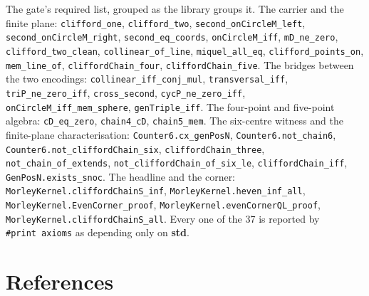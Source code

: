 \documentclass[11pt]{article}
\theoremstyle{definition}
\theoremstyle{remark}
\begin{document}
The gate's required list, grouped as the library groups it. The carrier and the finite plane:
\texttt{clifford\_\allowbreak one}, \texttt{clifford\_\allowbreak two}, \texttt{second\_\allowbreak onCircleM\_\allowbreak left}, \texttt{second\_\allowbreak onCircleM\_\allowbreak right}, \texttt{second\_\allowbreak eq\_\allowbreak coords},
\texttt{onCircleM\_\allowbreak iff}, \texttt{mD\_\allowbreak ne\_\allowbreak zero}, \texttt{clifford\_\allowbreak two\_\allowbreak clean}, \texttt{collinear\_\allowbreak of\_\allowbreak line}, \texttt{miquel\_\allowbreak all\_\allowbreak eq},
\texttt{clifford\_\allowbreak points\_\allowbreak on}, \texttt{mem\_\allowbreak line\_\allowbreak of}, \texttt{cliffordChain\_\allowbreak four}, \texttt{cliffordChain\_\allowbreak five}. The bridges between the
two encodings: \texttt{collinear\_\allowbreak iff\_\allowbreak conj\_\allowbreak mul}, \texttt{transversal\_\allowbreak iff}, \texttt{triP\_\allowbreak ne\_\allowbreak zero\_\allowbreak iff}, \texttt{cross\_\allowbreak second},
\texttt{cycP\_\allowbreak ne\_\allowbreak zero\_\allowbreak iff}, \texttt{onCircleM\_\allowbreak iff\_\allowbreak mem\_\allowbreak sphere}, \texttt{genTriple\_\allowbreak iff}. The four-point and five-point algebra:
\texttt{cD\_\allowbreak eq\_\allowbreak zero}, \texttt{chain4\_\allowbreak cD}, \texttt{chain5\_\allowbreak mem}. The six-centre witness and the finite-plane characterisation:
\texttt{Counter6.\allowbreak cx\_\allowbreak genPosN}, \texttt{Counter6.\allowbreak not\_\allowbreak chain6}, \texttt{Counter6.\allowbreak not\_\allowbreak cliffordChain\_\allowbreak six}, \texttt{cliffordChain\_\allowbreak three},
\texttt{not\_\allowbreak chain\_\allowbreak of\_\allowbreak extends}, \texttt{not\_\allowbreak cliffordChain\_\allowbreak of\_\allowbreak six\_\allowbreak le}, \texttt{cliffordChain\_\allowbreak iff}, \texttt{GenPosN.\allowbreak exists\_\allowbreak snoc}. The
headline and the corner: \texttt{MorleyKernel.\allowbreak cliffordChainS\_\allowbreak inf}, \texttt{MorleyKernel.\allowbreak heven\_\allowbreak inf\_\allowbreak all},
\texttt{MorleyKernel.\allowbreak EvenCorner\_\allowbreak proof}, \texttt{MorleyKernel.\allowbreak evenCornerQL\_\allowbreak proof}, \texttt{MorleyKernel.\allowbreak cliffordChainS\_\allowbreak all}.
Every one of the 37 is reported by \texttt{\#print\ axioms} as depending only on \textbf{std}.

\hypertarget{references}{%
\section*{References}\label{references}}
\end{document}
